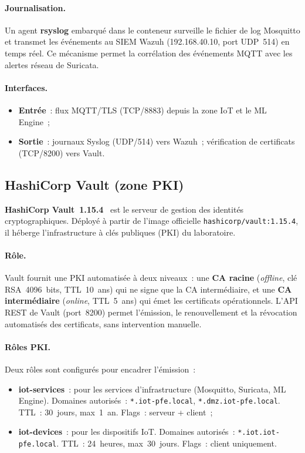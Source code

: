 \paragraph{Journalisation.}
Un agent \textbf{rsyslog} embarqué dans le conteneur surveille le fichier de log Mosquitto et transmet les événements au SIEM Wazuh (192.168.40.10, port UDP~514) en temps réel. Ce mécanisme permet la corrélation des événements MQTT avec les alertes réseau de Suricata.

\paragraph{Interfaces.}
\begin{itemize}[leftmargin=*]
  \item \textbf{Entrée}~: flux MQTT/TLS (TCP/8883) depuis la zone IoT et le ML Engine~;
  \item \textbf{Sortie}~: journaux Syslog (UDP/514) vers Wazuh~; vérification de certificats (TCP/8200) vers Vault.
\end{itemize}

\subsection{HashiCorp Vault (zone PKI)}
\label{subsec:env-vault}

\textbf{HashiCorp Vault~1.15.4}~\cite{vault_pki} est le serveur de gestion des identités cryptographiques. Déployé à partir de l'image officielle \texttt{hashicorp/vault:1.15.4}, il héberge l'infrastructure à clés publiques (PKI) du laboratoire.

\paragraph{Rôle.}
Vault fournit une PKI automatisée à deux niveaux~: une \textbf{CA racine} (\emph{offline}, clé RSA~4096~bits, TTL~10~ans) qui ne signe que la CA intermédiaire, et une \textbf{CA intermédiaire} (\emph{online}, TTL~5~ans) qui émet les certificats opérationnels. L'API REST de Vault (port~8200) permet l'émission, le renouvellement et la révocation automatisés des certificats, sans intervention manuelle.

\paragraph{Rôles PKI.}
Deux rôles sont configurés pour encadrer l'émission~:
\begin{itemize}[leftmargin=*]
  \item \textbf{iot-services}~: pour les services d'infrastructure (Mosquitto, Suricata, ML Engine). Domaines autorisés~: \texttt{*.iot-pfe.local}, \texttt{*.dmz.iot-pfe.local}. TTL~: 30~jours, max~1~an. Flags~: serveur + client~;
  \item \textbf{iot-devices}~: pour les dispositifs IoT. Domaines autorisés~: \texttt{*.iot.iot-pfe.local}. TTL~: 24~heures, max~30~jours. Flags~: client uniquement.
\end{itemize}

